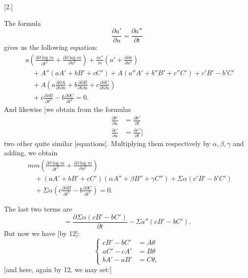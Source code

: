 %
\begin{center}[2.]\end{center}
\noindent\hspace*{1.2em} The formula
\[
\frac{\partial a'}{\partial u}=\frac{\partial a''}{\partial t}
\]
gives us the following equation:
\[
\begin{aligned}
&a\left(\frac{\partial\partial\log m}{\partial t^2}+\frac{\partial\partial\log m}{\partial u^2}\right)+\frac{m''}m\left(a'+\frac{\partial\partial x}{\partial u^2}\right)\\
&\quad+A''(aA'+bB'+cC')+A(a''A'+b''B'+c''C')+c'B'-b'C'\\
&\quad+A\left(a\frac{\partial\partial A}{\partial t\partial u}+b\frac{\partial\partial B}{\partial t\partial u}+c\frac{\partial\partial C}{\partial t\partial u}\right)\\
&\quad+c\frac{\partial\partial B}{\partial t^2}-b\frac{\partial\partial C}{\partial t^2}=0.
\end{aligned}
\]
And likewise [we obtain from the formulas
\[
\begin{aligned}
\frac{\partial b'}{\partial u}&=\frac{\partial b''}{\partial t}\\
\frac{\partial c'}{\partial u}&=\frac{\partial c''}{\partial t}]
\end{aligned}
\]
two other quite similar [equations]. Multiplying them respectively by $\alpha,\beta,\gamma$ and adding, we obtain
\[
\begin{aligned}
&mm\left(\frac{\partial\partial\log m}{\partial t^2}+\frac{\partial\partial\log m}{\partial u^2}\right)\\
&\quad+(aA'+bB'+cC')(\alpha A''+\beta B''+\gamma C'')+\Sigma\alpha(c'B'-b'C')\\
&\quad+\Sigma\alpha\left(c\frac{\partial\partial B}{\partial t^2}-b\frac{\partial\partial C}{\partial t^2}\right)=0.
\end{aligned}
\]
\par\indent The last two terms are
\[
=\frac{\partial\Sigma\alpha(cB'-bC')}{\partial t}-\Sigma a''(cB'-bC').
\]
But now we have [by 12]:
\begin{equation}\tag*{[23]}
\left\{\begin{aligned}
cB'-bC'&=A\theta\\
aC'-cA'&=B\theta\\
bA'-aB'&=C\theta,
\end{aligned}\right.
\end{equation}
[and here, again by 12, we may set:]
